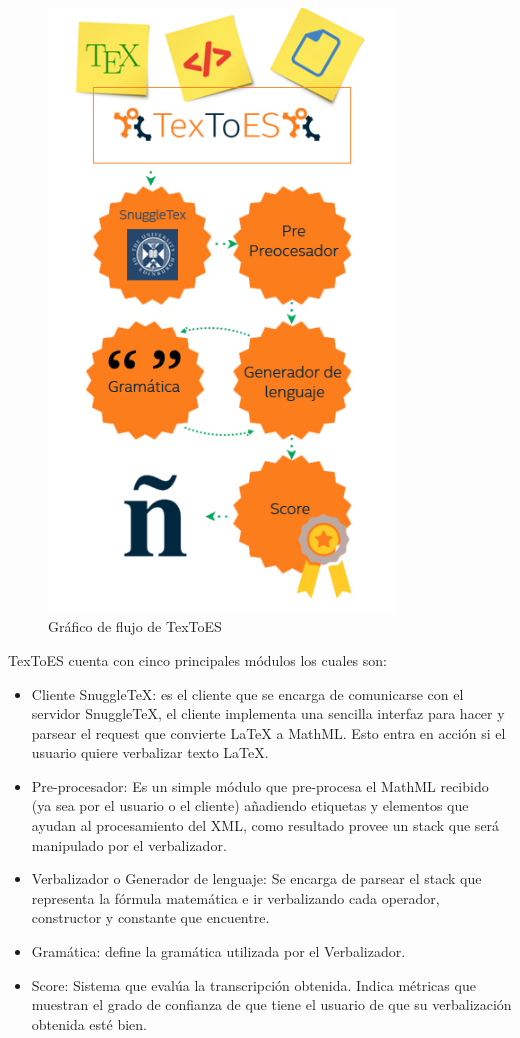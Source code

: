 \begin{figure}[H]
\centering
  \includegraphics[width=9.22cm, height=16cm]{Figures/detalle-arqui}
  \caption[]{Gráfico de flujo de TexToES}
\label{fig:arquitectura}
\end{figure}

TexToES cuenta con cinco principales módulos los cuales son:

\begin{itemize}
\item Cliente SnuggleTeX: es el cliente que se encarga de comunicarse con el servidor SnuggleTeX, el cliente implementa una sencilla interfaz para hacer y parsear el request que convierte LaTeX a MathML. Esto entra en acción si el usuario quiere verbalizar texto LaTeX.
\item Pre-procesador: Es un simple módulo que pre-procesa el MathML recibido (ya sea por el usuario o el cliente) añadiendo etiquetas y elementos que ayudan al procesamiento del XML, como resultado provee un stack que será manipulado por el verbalizador.
\item Verbalizador o Generador de lenguaje: Se encarga de parsear el stack que representa la fórmula matemática e ir verbalizando cada operador, constructor y constante que encuentre.
\item Gramática: define la gramática utilizada por el Verbalizador.
\item Score: Sistema que evalúa la transcripción obtenida. Indica métricas que muestran el grado de confianza de que tiene el usuario de que su verbalización obtenida esté bien.
\end{itemize}

